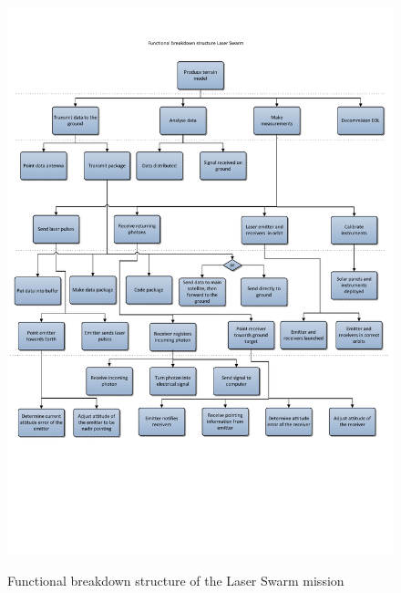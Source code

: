 \begin{figure}
\begin{center}
\includegraphics[trim = 0mm 60mm 0mm 0mm, clip, scale=0.7]{chapters/img/pic_FBS.pdf}
\label{pic_FBS}
\caption{Functional breakdown structure of the Laser Swarm mission}
\end{center}
\end{figure}